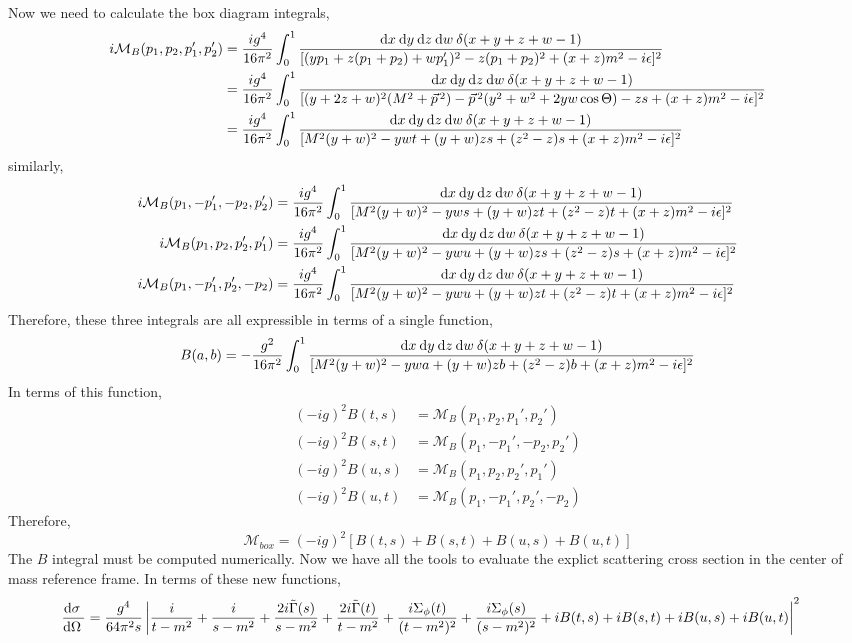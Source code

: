 \documentclass{article}
\begin{document}
Now we need to calculate the box diagram integrals,
\begin{align*}  
i\mathcal{M}_B(p_1, p_2, p_1', p_2') &= \frac{ig^4}{16 \pi^2} \int_{0}^{1} \frac{\mathrm{d}x \: \mathrm{d}y \: \mathrm{d}z \: \mathrm{d}w \: \delta(x + y + z + w - 1) }{[(y p_1 + z (p_1 + p_2) + w p_1' )^2 - z (p_1 + p_2)^2 + (x + z)m^2 - i \epsilon]^2} 
\\
& = \frac{ig^4}{16 \pi^2} \int_{0}^{1} \frac{\mathrm{d}x \: \mathrm{d}y \: \mathrm{d}z \: \mathrm{d}w \: \delta(x + y + z + w - 1) }{[(y + 2 z + w)^2 (M^2 + \vec{p}^{\, 2}) - \vec{p}^{\, 2}(y^2 + w^2 + 2 yw \cos{\Theta}) - z s + (x + z)m^2 - i \epsilon]^2} 
\\
& = \frac{ig^4}{16 \pi^2} \int_{0}^{1} \frac{\mathrm{d}x \: \mathrm{d}y \: \mathrm{d}z \: \mathrm{d}w \: \delta(x + y + z + w - 1) }{[M^2 (y + w)^2 - yw t + (y + w)z s + (z^2 - z)s + (x + z)m^2 - i \epsilon]^2} 
\end{align*}
similarly,
\begin{align*}  
i\mathcal{M}_B(p_1, -p_1', -p_2, p_2') & = \frac{ig^4}{16 \pi^2} \int_{0}^{1} \frac{\mathrm{d}x \: \mathrm{d}y \: \mathrm{d}z \: \mathrm{d}w \: \delta(x + y + z + w - 1) }{[M^2 (y + w)^2 - yw s + (y + w)z t + (z^2 - z) t + (x + z)m^2 - i \epsilon]^2} 
\\
i\mathcal{M}_B(p_1, p_2, p_2', p_1') & = \frac{ig^4}{16 \pi^2} \int_{0}^{1} \frac{\mathrm{d}x \: \mathrm{d}y \: \mathrm{d}z \: \mathrm{d}w \: \delta(x + y + z + w - 1) }{[M^2 (y + w)^2 - yw u + (y + w)z s + (z^2 - z) s + (x + z)m^2 - i \epsilon]^2} 
\\
i\mathcal{M}_B(p_1, -p_1', p_2', -p_2) & = \frac{ig^4}{16 \pi^2} \int_{0}^{1} \frac{\mathrm{d}x \: \mathrm{d}y \: \mathrm{d}z \: \mathrm{d}w \: \delta(x + y + z + w - 1) }{[M^2 (y + w)^2 - yw u + (y + w)z t + (z^2 - z) t + (x + z)m^2 - i \epsilon]^2} 
\end{align*}
Therefore, these three integrals are all expressible in terms of a single function,
\[ B(a,b) = -\frac{g^2}{16 \pi^2} \int_{0}^{1} \frac{\mathrm{d}x \: \mathrm{d}y \: \mathrm{d}z \: \mathrm{d}w \: \delta(x + y + z + w - 1) }{[M^2 (y + w)^2 - yw a + (y + w)z b + (z^2 - z) b + (x + z)m^2 - i \epsilon]^2} \]
In terms of this function,
\begin{align*}
(-ig)^2 B(t, s) &= \mathcal{M}_B(p_1, p_2, p_1', p_2') \\
(-ig)^2 B(s, t) &= \mathcal{M}_B(p_1, -p_1', -p_2, p_2') \\
(-ig)^2 B(u, s) &= \mathcal{M}_B(p_1, p_2, p_2', p_1') \\
(-ig)^2 B(u, t) &= \mathcal{M}_B(p_1, -p_1', p_2', -p_2) 
\end{align*}
Therefore,
\[\mathcal{M}_{box} = (-ig)^2[B(t, s) + B(s, t) + B(u, s) + B(u,t)]\]
The $B$ integral must be computed numerically.
Now we have all the tools to evaluate the explict scattering cross section in the center of mass reference frame. In terms of these new functions,
\begin{align*}
\frac{\mathrm{d}\sigma \:}{\mathrm{d}\Omega \:} 
&= \frac{g^4}{64 \pi^2 s} \left| \frac{i}{t - m^2} + \frac{i}{s - m^2} + \frac{2i \tilde{\Gamma}(s)}{s - m^2} + \frac{2i \tilde{\Gamma}(t)}{t - m^2} + \frac{i \Sigma_\phi(t)}{(t - m^2)^2} + \frac{i \Sigma_\phi(s)}{(s - m^2)^2} + i B(t, s) + i B(s, t) + i B(u, s) + i B(u,t)  \right|^2 
\end{align*}
\end{document}

